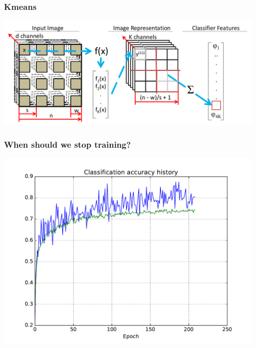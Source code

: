\documentclass{beamer}
\begin{document}
\begin{frame}
\frametitle{Kmeans}
\includegraphics[width=\textwidth]{kmeans.png} 
\end{frame}
\begin{frame}
\frametitle{When should we stop training?}
\includegraphics[width=.9\textwidth]{kmeans_acc-eps-converted-to.pdf}
\end{frame}
\end{document}
